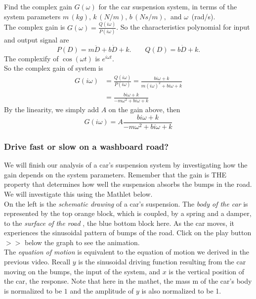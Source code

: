 Find the complex gain $G(\omega)$ for the car suspension system,
in terms of the system parameters $m\, (kg),\,  k\, (N/m),\, b\, (Ns/m),\,$
and $\omega\,$ (rad/s). \\

The complex gain is $G(\omega) = \frac{Q(i \omega)}{P(i \omega)}$.
So the characteristics polynomial for input and output signal are
\begin{equation*}
  P(D) = m \ddot D + b \dot D + k. \qquad Q(D) = b \dot D + k.  
\end{equation*}
The complexify of $\cos (\omega t)$ is $e^{i \omega t}$.\\
So the complex gain of system is
\begin{align*}
  G(i \omega)
  &= \frac{Q(i \omega)}{P(i \omega)} = \frac{bi \omega + k}{m(i \omega)^2 + bi \omega + k} \\
  &= \frac{bi \omega + k}{-m \omega ^2 + bi \omega + k}
\end{align*}
By the linearity, we simply add $A$ on the gain above, then
\begin{equation*}
  G(i \omega) = A \frac{bi \omega + k}{-m \omega ^2 + bi \omega + k}
\end{equation*}

\subsubsection{Drive fast or slow on a washboard road?}

We will finish our analysis of a car's suspension system by investigating how the gain depends on the system parameters.
Remember that the gain is THE property that determines how well the suspension absorbs the bumps in the road.
We will investigate this using the Mathlet below. \\

On the left is the \emph{schematic drawing} of a car's suspension.
The \emph{\color{orange} body of the car} is represented by the top orange block,
which is coupled, by a spring and a damper, to the \emph{\color{blue}surface of the road} ,
the blue bottom block here.
As the car moves, it experiences the sinusoidal pattern of bumps of the road.
Click on the play button $>>$ below the graph to see the animation.\\

The \emph{equation of motion} is equivalent to the equation of motion we derived in the previous video.
Recall $y$ is the sinusoidal driving function resulting from the car moving on the bumps,
the input of the system, and $x$ is the vertical position of the car, the response.
Note that here in the mathet, the mass m of the car's body is normalized to be $1$
and the amplitude of $y$ is also normalized to be 1. \\

